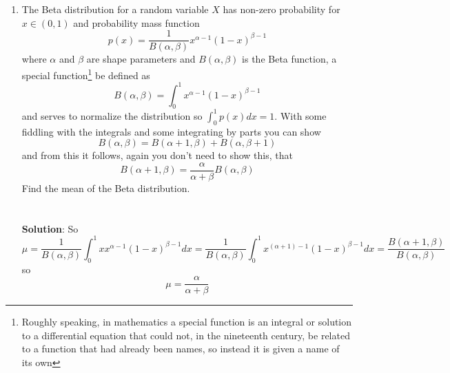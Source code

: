 \documentclass[11pt,a4paper]{scrartcl}
\begin{document}
\begin{enumerate}
    
\item The Beta distribution for a random variable $X$ has non-zero probability for $x\in(0,1)$ and probability mass function
  \begin{equation}
    p(x)=\frac{1}{B(\alpha,\beta)}x^{\alpha-1}(1-x)^{\beta-1}
  \end{equation}
  where $\alpha$ and $\beta$ are shape parameters and $B(\alpha,\beta)$ is the Beta function, a special function\footnote{Roughly speaking, in mathematics a special function is an integral or solution to a differential equation that could not, in the nineteenth century, be related to a function that had already been names, so instead it is given a name of its own} be defined as
  \begin{equation}
    B(\alpha,\beta)=\int_0^1 x^{\alpha-1}(1-x)^{\beta-1}
  \end{equation}
  and serves to normalize the distribution so $\int_0^1{p(x)dx} =1$. With some fiddling with the integrals and some integrating by parts you can show
  \begin{equation}
    B(\alpha,\beta)=B(\alpha+1,\beta)+B(\alpha,\beta+1)
  \end{equation}
  and from this it follows, again you don't need to show this, that
  \begin{equation}
    B(\alpha+1,\beta)=\frac{\alpha}{\alpha+\beta}B(\alpha,\beta)
  \end{equation}
  Find the mean of the Beta distribution.
  \\ \\ \\ \textbf{Solution}:
  So
  \begin{equation}
    \mu=\frac{1}{B(\alpha,\beta)}\int_0^1 x x^{\alpha-1}(1-x)^{\beta-1}dx=\frac{1}{B(\alpha,\beta)}\int_0^1 x^{(\alpha+1)-1}(1-x)^{\beta-1}dx=\frac{B(\alpha+1,\beta)}{B(\alpha,\beta)}
  \end{equation}
  so
  \begin{equation}
    \mu=\frac{\alpha}{\alpha+\beta}
  \end{equation}


\end{enumerate}
\end{document}
